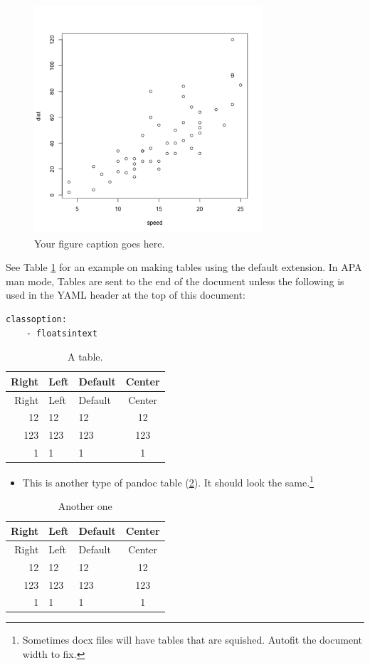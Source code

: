 \documentclass[doc,longtable]{apa6}
\let\tightlist\relax %
\begin{document}
\begin{figure}
\centering
\includegraphics[width=3.333in,height=3.333in]{example/plot.png}
\caption{Your figure caption goes here.\label{fig:myplot}}
\end{figure}

See Table \ref{tbl:mytable} for an example on making tables using the
default extension. In APA man mode, Tables are sent to the end of the
document unless the following is used in the YAML header at the top of
this document:

\begin{verbatim}
classoption:
    - floatsintext
\end{verbatim}

\begin{longtable}[]{@{}rllc@{}}
\caption{A table. \label{tbl:mytable}}\tabularnewline
\toprule
Right & Left & Default & Center\tabularnewline
\midrule
\endfirsthead
\toprule
Right & Left & Default & Center\tabularnewline
\midrule
\endhead
12 & 12 & 12 & 12\tabularnewline
123 & 123 & 123 & 123\tabularnewline
1 & 1 & 1 & 1\tabularnewline
\bottomrule
\end{longtable}

\begin{itemize}
\tightlist
\item
  This is another type of pandoc table (\ref{tbl:anotherone}). It should
  look the same.\footnote{Sometimes docx files will have tables that are
    squished. Autofit the document width to fix.}
\end{itemize}

\begin{longtable}[]{@{}rllc@{}}
\caption{Another one \label{tbl:anotherone}}\tabularnewline
\toprule
Right & Left & Default & Center\tabularnewline
\midrule
\endfirsthead
\toprule
Right & Left & Default & Center\tabularnewline
\midrule
\endhead
12 & 12 & 12 & 12\tabularnewline
123 & 123 & 123 & 123\tabularnewline
1 & 1 & 1 & 1\tabularnewline
\bottomrule
\end{longtable}
\end{document}
